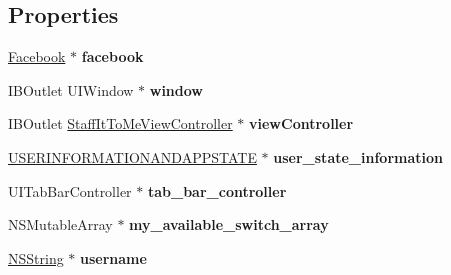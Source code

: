 \subsection*{\-Properties}
\begin{DoxyCompactItemize}
\item 
\hypertarget{interface_staff_it_to_me_app_delegate_aa1ddf2d63236dffba39d0f232abf564d}{
\hyperlink{interface_facebook}{\-Facebook} $\ast$ {\bfseries facebook}}
\label{interface_staff_it_to_me_app_delegate_aa1ddf2d63236dffba39d0f232abf564d}

\item 
\hypertarget{interface_staff_it_to_me_app_delegate_a10b833f0cd75af172cffbf313cea062f}{
\-I\-B\-Outlet \-U\-I\-Window $\ast$ {\bfseries window}}
\label{interface_staff_it_to_me_app_delegate_a10b833f0cd75af172cffbf313cea062f}

\item 
\hypertarget{interface_staff_it_to_me_app_delegate_a25b1a27cc8ad26ddf5253c63fdfc307f}{
\-I\-B\-Outlet \*
\hyperlink{interface_staff_it_to_me_view_controller}{\-Staff\-It\-To\-Me\-View\-Controller} $\ast$ {\bfseries view\-Controller}}
\label{interface_staff_it_to_me_app_delegate_a25b1a27cc8ad26ddf5253c63fdfc307f}

\item 
\hypertarget{interface_staff_it_to_me_app_delegate_a24eea0dd2ed95e4814f6b8091953dbf4}{
\hyperlink{interface_u_s_e_r_i_n_f_o_r_m_a_t_i_o_n_a_n_d_a_p_p_s_t_a_t_e}{\-U\-S\-E\-R\-I\-N\-F\-O\-R\-M\-A\-T\-I\-O\-N\-A\-N\-D\-A\-P\-P\-S\-T\-A\-T\-E} $\ast$ {\bfseries user\-\_\-state\-\_\-information}}
\label{interface_staff_it_to_me_app_delegate_a24eea0dd2ed95e4814f6b8091953dbf4}

\item 
\hypertarget{interface_staff_it_to_me_app_delegate_a864cc667748acebf73e71cb8498de590}{
\-U\-I\-Tab\-Bar\-Controller $\ast$ {\bfseries tab\-\_\-bar\-\_\-controller}}
\label{interface_staff_it_to_me_app_delegate_a864cc667748acebf73e71cb8498de590}

\item 
\hypertarget{interface_staff_it_to_me_app_delegate_a09d4b5fe36eb88a5dedb8abf8ec00ae7}{
\-N\-S\-Mutable\-Array $\ast$ {\bfseries my\-\_\-available\-\_\-switch\-\_\-array}}
\label{interface_staff_it_to_me_app_delegate_a09d4b5fe36eb88a5dedb8abf8ec00ae7}

\item 
\hypertarget{interface_staff_it_to_me_app_delegate_abce27a20c518c261cc31d4c1a52b9df3}{
\hyperlink{class_n_s_string}{\-N\-S\-String} $\ast$ {\bfseries username}}
\label{interface_staff_it_to_me_app_delegate_abce27a20c518c261cc31d4c1a52b9df3}

\end{DoxyCompactItemize}



